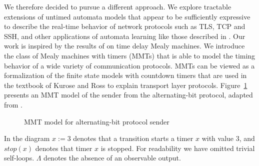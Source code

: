 We therefore decided to pursue a different approach. We explore tractable extensions of untimed automata models that appear to
be sufficiently expressive to describe the real-time behavior of network protocols such as TLS, TCP and SSH, and other
applications of automata learning like those described in \cite{Vaa17}.
%
Our work is inspired by the results of \cite{CCF16} on time delay Mealy machines.
We introduce the class of Mealy machines with timers (MMTs) that 
is able to model the timing behavior of a wide variety of communication protocols.
MMTs can be viewed as a formalization of the finite state models with countdown timers that are used in the textbook of
Kurose and Ross \cite{KR13} to explain transport layer protocols.
Figure~\ref{fig:abp} presents an MMT model of the sender from 
the alternating-bit protocol, adapted from \cite[Figure 3.15]{KR13}.
\begin{figure}[h]
\centering
\vspace{-2 em}
\caption{MMT model for alternating-bit protocol sender}
\label{fig:abp}
\end{figure}
In the diagram $x :=3$ denotes that a transition starts a timer $x$ with value $3$,
and $\mathit{stop}(x)$ denotes that timer $x$ is stopped.
For readability we have omitted trivial self-loops.
\iflong
$\Lambda$ denotes the absence of an observable output. 

